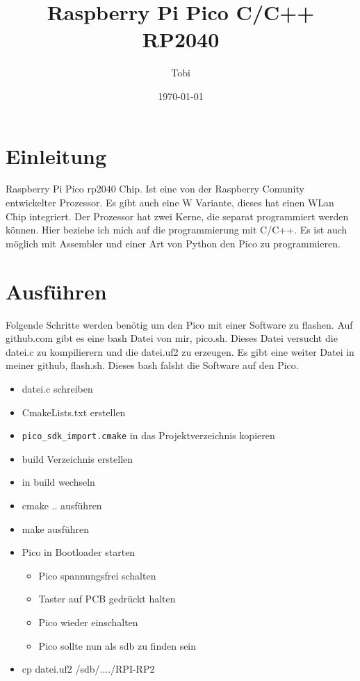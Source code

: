 \documentclass[a4paper,12pt,twoside]{article}
\title{Raspberry Pi Pico C/C++
       RP2040}
\author{Tobi}
\date{\today}
\begin{document}
\maketitle
\thispagestyle{empty} %
\newpage

\tableofcontents
\newpage

\section{Einleitung}
Raspberry Pi Pico rp2040 Chip. Ist eine von der Raspberry Comunity entwickelter Prozessor.
Es gibt auch eine W Variante, dieses hat einen WLan Chip integriert.
Der Prozessor hat zwei Kerne, die separat programmiert werden können.
Hier beziehe ich mich auf die programmierung mit C/C++.
Es ist auch möglich mit Assembler und einer Art von Python den Pico zu programmieren.
\section{Ausführen}
Folgende Schritte werden benötig um den Pico mit einer Software zu flashen.
Auf github.com gibt es eine bash Datei von mir, pico.sh.
Dieses Datei versucht die datei.c zu kompilierern und die datei.uf2 zu erzeugen.
Es gibt eine weiter Datei in meiner github, flash.sh. Dieses bash falsht die Software auf den Pico.
\begin{itemize}
	\item datei.c schreiben
	\item CmakeLists.txt erstellen
	\item \verb|pico_sdk_import.cmake| in das Projektverzeichnis kopieren
	\item build Verzeichnis erstellen
	\item in build wechseln
	\item cmake .. ausführen
	\item make ausführen
	\item Pico in Bootloader starten
	      \begin{itemize}
		      \item Pico spannungsfrei schalten
		      \item Taster auf PCB gedrückt halten
		      \item Pico wieder einschalten
		      \item Pico sollte nun als sdb zu finden sein
	      \end{itemize}
	\item cp datei.uf2 /sdb/..../RPI-RP2
\end{itemize}
\end{document}
